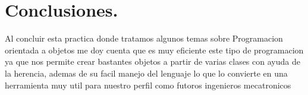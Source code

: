 \documentclass[12pt]{article}
\begin{document}
\section{Conclusiones.}

Al concluir esta practica donde tratamos algunos temas sobre Programacion orientada a objetos me doy cuenta que es muy eficiente este tipo de programacion ya que nos permite crear bastantes objetos a partir de varias clases con ayuda de la herencia, ademas de su facil manejo del lenguaje lo que lo convierte en una herramienta muy util para nuestro perfil como futoros ingenieros mecatronicos









 
\end{document}
